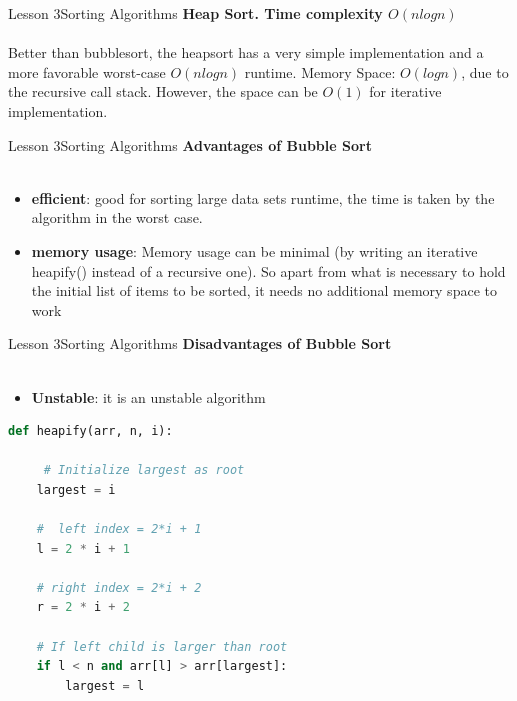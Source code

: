 \documentclass[aspectratio=1610]{beamer}
\begin{document}
\begin{frame}{Lesson 3}{Sorting Algorithms}
\LARGE
\textbf{Heap Sort. Time complexity $O(n log n)$}\\~\\
Better than bubblesort, the heapsort has a very simple implementation and a more 
favorable worst-case $O(n log n)$ runtime. Memory Space: $O(log n)$, due to the 
recursive call stack. However, the space can be $O(1)$ for iterative
implementation.
\end{frame}


\begin{frame}{Lesson 3}{Sorting Algorithms}
\LARGE
\textbf{Advantages of Bubble Sort}\\~\\
\Large
\begin{itemize}
	\item \textbf{efficient}: good for sorting large data sets runtime, the time is taken by the algorithm in the worst case.
	\item \textbf{memory usage}: Memory usage can be minimal (by writing an iterative heapify() instead of a recursive one). So apart from what is necessary to hold the initial list of items to be sorted, it needs no additional memory space to work
\end{itemize}
\end{frame}


\begin{frame}{Lesson 3}{Sorting Algorithms}
\LARGE
\textbf{Disadvantages of Bubble Sort}\\~\\
\Large
\begin{itemize}
	\item \textbf{Unstable}: it is an unstable algorithm
\end{itemize}

\end{frame}


\begin{frame}[fragile]
\begin{lstlisting}[language=Python]
def heapify(arr, n, i):
    
     # Initialize largest as root
    largest = i 
    
    #  left index = 2*i + 1
    l = 2 * i + 1 
    
    # right index = 2*i + 2
    r = 2 * i + 2  

    # If left child is larger than root
    if l < n and arr[l] > arr[largest]:
        largest = l

  \end{lstlisting}
\end{frame}
\end{document}
